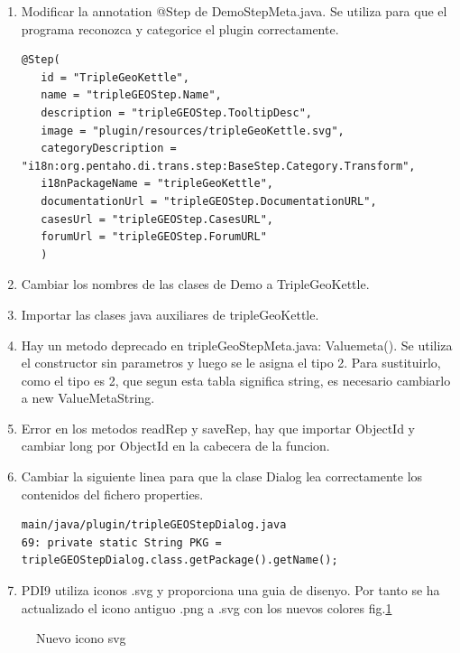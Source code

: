 \begin{enumerate}
    \item Modificar la annotation @Step de DemoStepMeta.java. Se utiliza para que el programa reconozca y
        categorice el plugin correctamente.
\begin{lstlisting}
@Step(
   id = "TripleGeoKettle",
   name = "tripleGEOStep.Name",
   description = "tripleGEOStep.TooltipDesc",
   image = "plugin/resources/tripleGeoKettle.svg",
   categoryDescription = "i18n:org.pentaho.di.trans.step:BaseStep.Category.Transform",
   i18nPackageName = "tripleGeoKettle",
   documentationUrl = "tripleGEOStep.DocumentationURL",
   casesUrl = "tripleGEOStep.CasesURL",
   forumUrl = "tripleGEOStep.ForumURL"
   )
\end{lstlisting}

    \item Cambiar los nombres de las clases de Demo a TripleGeoKettle.
    \item Importar las clases java auxiliares de tripleGeoKettle.
    \item Hay un metodo deprecado en tripleGeoStepMeta.java: Valuemeta(). Se utiliza el constructor sin
        parametros y luego se le asigna el tipo 2. Para sustituirlo, como el tipo es 2, que segun esta
        tabla\cite{tabla-string} significa string, es necesario cambiarlo a new ValueMetaString.

\item Error en los metodos readRep y saveRep, hay que importar ObjectId
 y cambiar long por ObjectId en la cabecera de la funcion.

\item Cambiar la siguiente linea para que la clase Dialog lea correctamente los contenidos del fichero properties.

\begin{lstlisting}
main/java/plugin/tripleGEOStepDialog.java
69: private static String PKG = tripleGEOStepDialog.class.getPackage().getName();
\end{lstlisting}

\item PDI9 utiliza iconos .svg y proporciona una guia de disenyo\cite{guia-diseno}. Por tanto se ha actualizado el
    icono antiguo .png a .svg con los nuevos colores fig.\ref{fig:icono-TGK}
\end{enumerate}

\begin{figure}[H]
  \centering
    
    \caption{Nuevo icono svg}
    \label{fig:icono-TGK}
    \centering
\end{figure}


